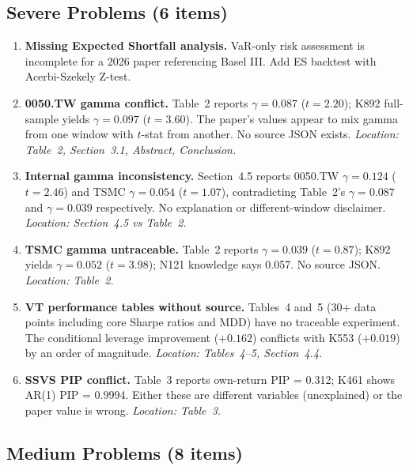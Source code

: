 \documentclass[12pt,a4paper]{article}
\begin{document}
\subsection*{\textcolor{errorred}{Severe Problems (6 items)}}

\begin{enumerate}[label=\textcolor{errorred}{S\arabic*}]
\item \textbf{Missing Expected Shortfall analysis.} VaR-only risk assessment is incomplete for a 2026 paper referencing Basel III. Add ES backtest with Acerbi-Szekely Z-test.

\item \textbf{0050.TW gamma conflict.} Table~2 reports $\gamma = 0.087$ ($t = 2.20$); K892 full-sample yields $\gamma = 0.097$ ($t = 3.60$). The paper's values appear to mix gamma from one window with $t$-stat from another. No source JSON exists. \textit{Location: Table~2, Section~3.1, Abstract, Conclusion.}

\item \textbf{Internal gamma inconsistency.} Section~4.5 reports 0050.TW $\gamma = 0.124$ ($t = 2.46$) and TSMC $\gamma = 0.054$ ($t = 1.07$), contradicting Table~2's $\gamma = 0.087$ and $\gamma = 0.039$ respectively. No explanation or different-window disclaimer. \textit{Location: Section~4.5 vs Table~2.}

\item \textbf{TSMC gamma untraceable.} Table~2 reports $\gamma = 0.039$ ($t = 0.87$); K892 yields $\gamma = 0.052$ ($t = 3.98$); N121 knowledge says 0.057. No source JSON. \textit{Location: Table~2.}

\item \textbf{VT performance tables without source.} Tables~4 and~5 (30+ data points including core Sharpe ratios and MDD) have no traceable experiment. The conditional leverage improvement ($+0.162$) conflicts with K553 ($+0.019$) by an order of magnitude. \textit{Location: Tables~4--5, Section~4.4.}

\item \textbf{SSVS PIP conflict.} Table~3 reports own-return PIP = 0.312; K461 shows AR(1) PIP = 0.9994. Either these are different variables (unexplained) or the paper value is wrong. \textit{Location: Table~3.}
\end{enumerate}

\subsection*{\textcolor{warncolor}{Medium Problems (8 items)}}
\end{document}
